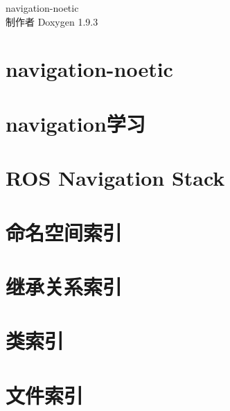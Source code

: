 \documentclass[twoside]{book}
\newcommand{\+}{\discretionary{\mbox{\scriptsize$\hookleftarrow$}}{}{}}
\newcommand{\clearemptydoublepage}{%
    \newpage{\pagestyle{empty}\cleardoublepage}%
  }
\begin{document}
  \raggedbottom
  \begin{CJK}{UTF8}{gbsn}
    \hypersetup{pageanchor=false,
                bookmarksnumbered=true,
                pdfencoding=unicode
               }
  \begin{titlepage}
  \vspace*{7cm}
  \begin{center}%
  {\Large navigation-\/noetic}\\
  \vspace*{1cm}
  {\large 制作者 Doxygen 1.9.3}\\
  \end{center}
  \end{titlepage}
  \clearemptydoublepage
  \tableofcontents
  \clearemptydoublepage
  \hypersetup{pageanchor=true}
\chapter{navigation-\/noetic}
\label{index}\hypertarget{index}{}
\chapter{navigation学习}
\label{md_navigation_xE5_xAD_xA6_xE4_xB9_xA0}

\chapter{ROS Navigation Stack}
\label{md__r_e_a_d_m_e}

\chapter{命名空间索引}

\chapter{继承关系索引}

\chapter{类索引}

\chapter{文件索引}


\end{CJK}
\end{document}
